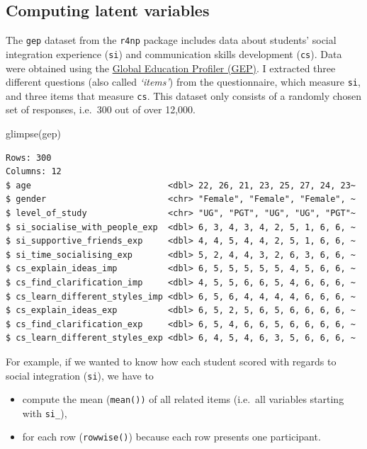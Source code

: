 \documentclass[
  letterpaper,
  DIV=11,
  numbers=noendperiod]{scrreprt}
\newenvironment{Shaded}{\begin{snugshade}}{\end{snugshade}}
\newcommand{\FunctionTok}[1]{\textcolor[rgb]{0.28,0.35,0.67}{#1}}
\newcommand{\NormalTok}[1]{\textcolor[rgb]{0.00,0.23,0.31}{#1}}
\begin{document}
\subsection{Computing latent
variables}\label{sec-computing-latent-variables}

The \texttt{gep} dataset from the \texttt{r4np} package includes data
about students' social integration experience (\texttt{si}) and
communication skills development (\texttt{cs}). Data were obtained using
the \href{https://warwick.ac.uk/gep}{Global Education Profiler (GEP)}. I
extracted three different questions (also called \emph{`items'}) from
the questionnaire, which measure \texttt{si}, and three items that
measure \texttt{cs}. This dataset only consists of a randomly chosen set
of responses, i.e.~300 out of over 12,000.

\begin{Shaded}
\begin{Highlighting}[]
\FunctionTok{glimpse}\NormalTok{(gep)}
\end{Highlighting}
\end{Shaded}

\begin{verbatim}
Rows: 300
Columns: 12
$ age                           <dbl> 22, 26, 21, 23, 25, 27, 24, 23~
$ gender                        <chr> "Female", "Female", "Female", ~
$ level_of_study                <chr> "UG", "PGT", "UG", "UG", "PGT"~
$ si_socialise_with_people_exp  <dbl> 6, 3, 4, 3, 4, 2, 5, 1, 6, 6, ~
$ si_supportive_friends_exp     <dbl> 4, 4, 5, 4, 4, 2, 5, 1, 6, 6, ~
$ si_time_socialising_exp       <dbl> 5, 2, 4, 4, 3, 2, 6, 3, 6, 6, ~
$ cs_explain_ideas_imp          <dbl> 6, 5, 5, 5, 5, 5, 4, 5, 6, 6, ~
$ cs_find_clarification_imp     <dbl> 4, 5, 5, 6, 6, 5, 4, 6, 6, 6, ~
$ cs_learn_different_styles_imp <dbl> 6, 5, 6, 4, 4, 4, 4, 6, 6, 6, ~
$ cs_explain_ideas_exp          <dbl> 6, 5, 2, 5, 6, 5, 6, 6, 6, 6, ~
$ cs_find_clarification_exp     <dbl> 6, 5, 4, 6, 6, 5, 6, 6, 6, 6, ~
$ cs_learn_different_styles_exp <dbl> 6, 4, 5, 4, 6, 3, 5, 6, 6, 6, ~
\end{verbatim}

For example, if we wanted to know how each student scored with regards
to social integration (\texttt{si}), we have to

\begin{itemize}
\item
  compute the mean (\texttt{mean())} of all related items (i.e.~all
  variables starting with \texttt{si\_}),
\item
  for each row (\texttt{rowwise()}) because each row presents one
  participant.
\end{itemize}
\end{document}
